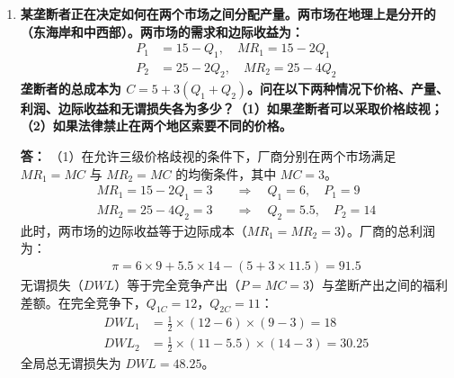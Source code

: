 \begin{enumerate}[label=\textbf{\arabic*.}, leftmargin=*]
		\item \textbf{某垄断者正在决定如何在两个市场之间分配产量。两市场在地理上是分开的（东海岸和中西部）。两市场的需求和边际收益为：}
		\[
		\begin{aligned}
			P_1 &= 15 - Q_1, \quad MR_1 = 15 - 2Q_1 \\
			P_2 &= 25 - 2Q_2, \quad MR_2 = 25 - 4Q_2
		\end{aligned}
		\]
		\textbf{垄断者的总成本为 $C = 5 + 3(Q_1 + Q_2)$。问在以下两种情况下价格、产量、利润、边际收益和无谓损失各为多少？（1）如果垄断者可以采取价格歧视；（2）如果法律禁止在两个地区索要不同的价格。}
		
		\textbf{答：}
		（1）在允许三级价格歧视的条件下，厂商分别在两个市场满足 $MR_1 = MC$ 与 $MR_2 = MC$ 的均衡条件，其中 $MC = 3$。
		\[
		\begin{aligned}
			MR_1 = 15 - 2Q_1 = 3 \quad &\Rightarrow \quad Q_1 = 6, \quad P_1 = 9 \\
			MR_2 = 25 - 4Q_2 = 3 \quad &\Rightarrow \quad Q_2 = 5.5, \quad P_2 = 14
		\end{aligned}
		\]
		此时，两市场的边际收益等于边际成本（$MR_1 = MR_2 = 3$）。厂商的总利润为：
		\[
		\begin{aligned}
			\pi = 6 \times 9 + 5.5 \times 14 - (5 + 3 \times 11.5) = 91.5
		\end{aligned}
		\]
		无谓损失（$DWL$）等于完全竞争产出（$P=MC=3$）与垄断产出之间的福利差额。在完全竞争下，$Q_{1C} = 12$，$Q_{2C} = 11$：
		\[
		\begin{aligned}
			DWL_1 &= \frac{1}{2} \times (12 - 6) \times (9 - 3) = 18 \\
			DWL_2 &= \frac{1}{2} \times (11 - 5.5) \times (14 - 3) = 30.25
		\end{aligned}
		\]
		全局总无谓损失为 $DWL = 48.25$。
		

\end{enumerate}
